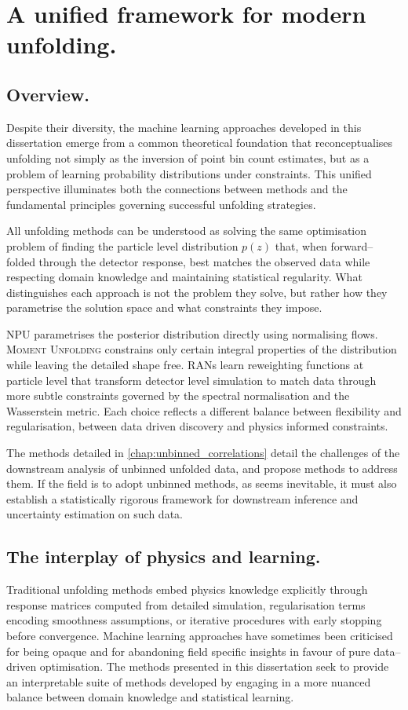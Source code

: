 \section{A unified framework for modern unfolding.}
\sectionminitoc
    \subsection{Overview.}
    Despite their diversity, the machine learning approaches developed in this dissertation emerge from a common theoretical foundation that reconceptualises unfolding not simply as the inversion of point bin count estimates, but as a problem of learning probability distributions under constraints.
    This unified perspective illuminates both the connections between methods and the fundamental principles governing successful unfolding strategies.
    
    All unfolding methods can be understood as solving the same optimisation problem of finding the particle level distribution \(p(z)\) that, when forward--folded through the detector response, best matches the observed data while respecting domain knowledge and maintaining statistical regularity.
    What distinguishes each approach is not the problem they solve, but rather how they parametrise the solution space and what constraints they impose.
    
    NPU parametrises the posterior distribution directly using normalising flows.
    \textsc{Moment Unfolding} constrains only certain integral properties of the distribution while leaving the detailed shape free.
    RANs learn reweighting functions at particle level that transform detector level simulation to match data through more subtle constraints governed by the spectral normalisation and the Wasserstein metric.
    Each choice reflects a different balance between flexibility and regularisation, between data driven discovery and physics informed constraints.

    The methods detailed in \cref{chap:unbinned_correlations} detail the challenges of the downstream analysis of unbinned unfolded data, and propose methods to address them.
    If the field is to adopt unbinned methods, as seems inevitable, it must also establish a statistically rigorous framework for downstream inference and uncertainty estimation on such data.

    \subsection{The interplay of physics and learning.}
        Traditional unfolding methods embed physics knowledge explicitly through response matrices computed from detailed simulation, regularisation terms encoding smoothness assumptions, or iterative procedures with early stopping before convergence.
        Machine learning approaches have sometimes been criticised for being opaque and for abandoning field specific insights in favour of pure data--driven optimisation.
        The methods presented in this dissertation seek to provide an interpretable suite of methods developed by engaging in a more nuanced balance between domain knowledge and statistical learning.
        
